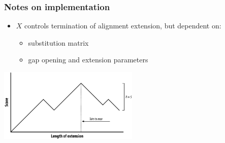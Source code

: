 \begin{frame}
  \frametitle{Notes on implementation}
  \begin{itemize}
    \item $X$ controls termination of alignment extension, but dependent on:
    \begin{itemize}
      \item substitution matrix
      \item gap opening and extension parameters
    \end{itemize}
  \end{itemize}
  \begin{center}
    \includegraphics[width=0.5\textwidth]{images/extension} 
  \end{center}    
\end{frame}